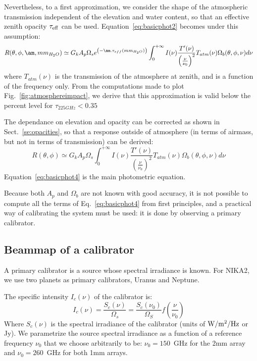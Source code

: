 Nevertheless, to a first approximation, we consider the shape of the atmospheric
transmission independent of the elevation and water content, so that an
effective zenith opacity $\tau_{\rm{eff}}$ can be used.
Equation~\ref{eq:basicphot2} becomes under this assumption: 
\begin{equation}
R(\theta, \phi, \am, mm_{H_{2}O}) \simeq G_{k}  A_{p}\Omega_{s} e^{\left(-\am
  . \tau_{eff}(mm_{H_{2}O})\right)} \int_{0}^{+\infty} I(\nu)
\frac{T'(\nu)}{\left(\frac{\nu}{\nu_{0}}\right)^{2}} T_{atm}(\nu)
\Omega_{b} (\theta, \phi, \nu) d\nu 
\label{eq:basicphot3}
\end{equation}
where $T_{atm}(\nu)$ is the transmission of the atmosphere at zenith,
and is a function of the frequency only. From the computations made to
plot Fig.~\ref{fig:atmosphereimpact}, we derive that this approximation 
is valid below the percent level for $\tau_{225GHz} < 0.35$

The dependance on elevation and opacity can be corrected as shown in
Sect.~\ref{se:opacities}, so that a response outside of atmosphere (in
terms of airmass, but not in terms of transmission) can be derived:
\begin{equation}
R(\theta, \phi) \simeq G_{k}  A_{p}\Omega_{s} \int_{0}^{+\infty} I(\nu)
\frac{T'(\nu)}{\left(\frac{\nu}{\nu_{0}}\right)^{2}} T_{atm}(\nu) \Omega_{b} (\theta, \phi, \nu)  d\nu 
\label{eq:basicphot4}
\end{equation}
Equation~\ref{eq:basicphot4} is the main photometric equation.

Because both $A_{p}$ and $ \Omega_{b} $ are not known with good
accuracy, it is not possible to compute all the terms of
Eq.~\ref{eq:basicphot4} from first principles, and a practical way of
calibrating the system must be used: it is done by observing a primary
calibrator.

\subsection{Beammap of a calibrator}

A primary calibrator is a source whose spectral irradiance is
known. For NIKA2, we use two planets as primary calibrators, Uranus
and Neptune.

The specific intensity $I_{c}(\nu)$ of the
calibrator is:
\begin{equation}
I_{c}(\nu) =  \frac{S_{c}(\nu)}{\Omega_{s}} =\frac{ S_{c}
(\nu_{0})}{\Omega_{S}} f(\frac{\nu}{\nu_{0}})  
\end{equation}
Where $S_{c}(\nu)$ is the spectral irradiance of the calibrator (units
of $\rm W/m^{2}/Hz$ or Jy). We parametrize the source spectral irradiance
as a function of a reference frequency $\nu_{0}$ that we choose
arbitrarily to be: $\nu_{0} = 150$~GHz for the 2mm array and $\nu_{0}
= 260$~GHz for both 1mm arrays. 


